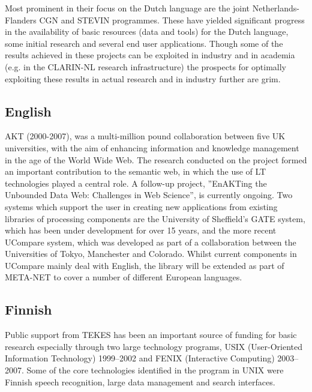 \documentclass[10pt, plain]{../../metanetpaper}
\begin{document}
\begin{multicols}{2}
\begin{small}
Most prominent in their focus on the Dutch language are the joint Netherlands-Flanders CGN and STEVIN programmes. These have yielded significant progress in the availability of basic resources (data and tools) for the Dutch language, some initial research and several end user applications. Though some of the results achieved in these projects can be exploited in industry and in academia (e.g. in the CLARIN-NL research infrastructure) the prospects for optimally exploiting these results in actual research and in industry further are grim. 

\subsection*{English}
\label{sec:english}

AKT (2000-2007), was a multi-million pound collaboration between five UK universities, with the aim of enhancing information and knowledge management in the age of the World Wide Web. The research conducted on the project formed an important contribution to the semantic web, in which the use of LT technologies played a central role. A follow-up project, ”EnAKTing the Unbounded Data Web: Challenges in Web Science”, is currently ongoing.
Two systems which support the user in creating new applications from existing libraries of processing components are the University of Sheffield’s GATE system, which has been under development for over 15 years, and the more recent UCompare system, which was developed as part of a collaboration between the Universities of Tokyo, Manchester and Colorado. Whilst current components in UCompare mainly deal with English, the library will be extended as part of META-NET to cover a number of different European languages.

%

\subsection*{Finnish}
\label{sec:finnish}

Public support from TEKES has been an important source of funding for basic research especially through two large technology programs, USIX (User-Oriented Information Technology) 1999--2002 and FENIX (Interactive Computing) 2003--2007. Some of the core technologies identified in the program in UNIX were Finnish speech recognition, large data management and search interfaces.


\end{small}
\end{multicols}
\end{document}
